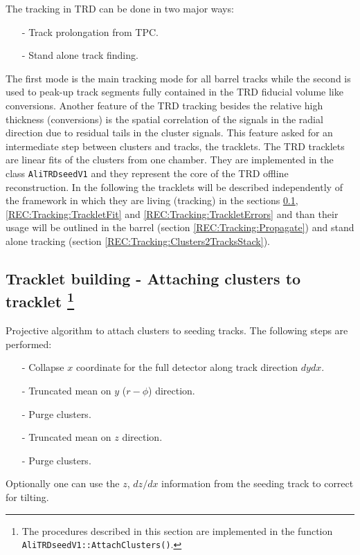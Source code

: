 \documentclass{alicetdr}
\begin{document}
\noindent
The tracking in TRD can be done in two major ways:
\begin{itemize}
\item[-] Track prolongation from TPC.
\item[-] Stand alone track finding.
\end{itemize}
The first mode is the main tracking mode for all barrel tracks while the second
is used to peak-up track segments fully contained in the TRD fiducial volume
like conversions. Another feature of the TRD tracking besides the relative high
thickness (conversions) is the spatial correlation of the signals in the radial
direction due to residual tails in the cluster signals. This feature asked for
an intermediate step between clusters and tracks, the tracklets. The TRD
tracklets are linear fits of the clusters from one chamber. They are implemented
in the class {\tt AliTRDseedV1} and they represent the core of the TRD offline
reconstruction. In the following the tracklets will be described independently
of the framework in which they are living (tracking) in the sections
\ref{REC:Tracking:TrackletAttach}, \ref{REC:Tracking:TrackletFit} and
\ref{REC:Tracking:TrackletErrors} and than their usage will be outlined in the
barrel (section \ref{REC:Tracking:Propagate}) and stand alone tracking (section
\ref{REC:Tracking:Clusters2TracksStack}).

\subsection[Tracklet building]{Tracklet building - Attaching clusters to tracklet
\footnote{The procedures described in this section are implemented in the function
{\tt AliTRDseedV1::AttachClusters()}.}}\label{REC:Tracking:TrackletAttach}

Projective algorithm to attach clusters to seeding tracks. The following steps are
performed:
\begin{enumerate}
\item[-] Collapse $x$ coordinate for the full detector along track direction $dy dx$.
\item[-] Truncated mean on $y$ ($r-\phi$) direction.
\item[-] Purge clusters.
\item[-] Truncated mean on $z$ direction.
\item[-] Purge clusters.
\end{enumerate}
Optionally one can use the $z$, $dz/dx$ information from the seeding track to
correct for tilting.
\end{document}
